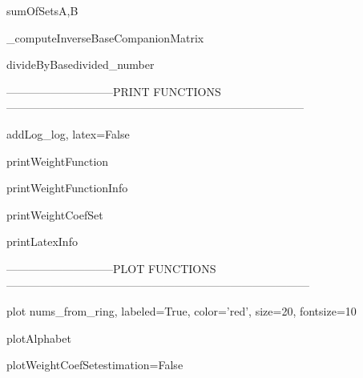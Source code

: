 \begin{method}{sumOfSets}{A,B}

\end{method}


\begin{method}{\_computeInverseBaseCompanionMatrix}{}

\end{method}


\begin{method}{divideByBase}{divided\_number}

\end{method}


-----------------------------PRINT FUNCTIONS--------------------------------------------------------------------------------

\begin{method}{addLog}{\_log, latex=False}

\end{method}


\begin{method}{printWeightFunction}{}

\end{method}


\begin{method}{printWeightFunctionInfo}{}

\end{method}


\begin{method}{printWeightCoefSet}{}

\end{method}


\begin{method}{printLatexInfo}{}

\end{method}


-----------------------------PLOT FUNCTIONS---------------------------------------------------------------------------------

\begin{method}{plot}{ nums\_from\_ring, labeled=True, color='red', size=20, fontsize=10}

\end{method}


\begin{method}{plotAlphabet}{}

\end{method}


\begin{method}{plotWeightCoefSet}{estimation=False}

\end{method}


